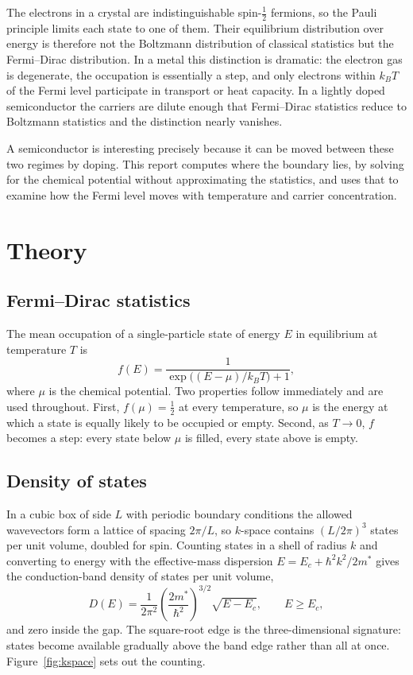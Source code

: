 \documentclass[aps,prb,reprint,nofootinbib]{revtex4-2}
\begin{document}
The electrons in a crystal are indistinguishable spin-$\tfrac12$ fermions, so the Pauli principle
limits each state to one of them. Their equilibrium distribution over energy is therefore not
the Boltzmann distribution of classical statistics but the Fermi--Dirac distribution. In a metal
this distinction is dramatic: the electron gas is degenerate, the occupation is essentially a
step, and only electrons within $k_BT$ of the Fermi level participate in transport or heat
capacity. In a lightly doped semiconductor the carriers are dilute enough that Fermi--Dirac
statistics reduce to Boltzmann statistics and the distinction nearly vanishes.

A semiconductor is interesting precisely because it can be moved between these two regimes by
doping. This report computes where the boundary lies, by solving for the chemical potential
without approximating the statistics, and uses that to examine how the Fermi level moves with
temperature and carrier concentration.

\section{Theory}
\label{sec:theory}

\subsection{Fermi--Dirac statistics}

The mean occupation of a single-particle state of energy $E$ in equilibrium at temperature $T$ is
\begin{equation}
  f(E) = \frac{1}{\exp\!\big((E-\mu)/k_BT\big)+1},
  \label{eq:fd}
\end{equation}
where $\mu$ is the chemical potential. Two properties follow immediately and are used
throughout. First, $f(\mu)=\tfrac12$ at every temperature, so $\mu$ is the energy at which a
state is equally likely to be occupied or empty. Second, as $T\to0$, $f$ becomes a step: every
state below $\mu$ is filled, every state above is empty.

\subsection{Density of states}

In a cubic box of side $L$ with periodic boundary conditions the allowed wavevectors form a
lattice of spacing $2\pi/L$, so $k$-space contains $(L/2\pi)^3$ states per unit volume, doubled
for spin. Counting states in a shell of radius $k$ and converting to energy with the
effective-mass dispersion $E = E_c + \hbar^2k^2/2m^*$ gives the conduction-band density of
states per unit volume,
\begin{equation}
  D(E) = \frac{1}{2\pi^2}\left(\frac{2m^*}{\hbar^2}\right)^{3/2}\sqrt{E-E_c},
  \qquad E \ge E_c,
  \label{eq:dos}
\end{equation}
and zero inside the gap. The square-root edge is the three-dimensional signature: states become
available gradually above the band edge rather than all at once.
Figure~\ref{fig:kspace} sets out the counting.
\end{document}
